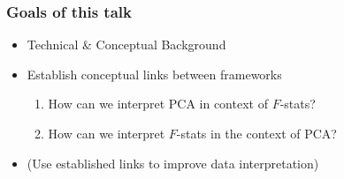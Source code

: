 \documentclass[11pt]{beamer}
\begin{document}
\begin{frame}
\frametitle{Goals of this talk}
\begin{itemize}
	\item Technical \& Conceptual Background
	\item Establish conceptual links between frameworks
	\begin{enumerate}
		\item How can we interpret PCA in context of $F$-stats?
		\item How can we interpret $F$-stats in the context of PCA?		
	\end{enumerate}
	\item (Use established links to improve data interpretation)
\end{itemize}
\end{frame}
\end{document}
